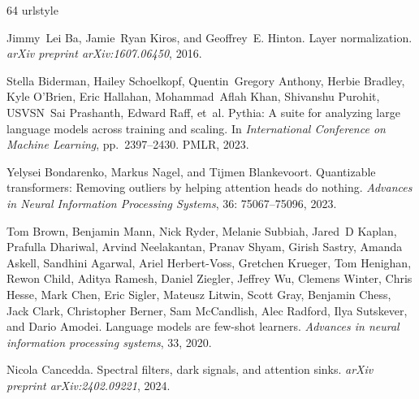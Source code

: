 \documentclass{article} \usepackage{iclr2025_conference,times}
\begin{document}
\begin{thebibliography}{64}
\providecommand{\natexlab}[1]{#1}
\providecommand{\url}[1]{\texttt{#1}}
\expandafter\ifx\csname urlstyle\endcsname\relax
  \providecommand{\doi}[1]{doi: #1}\else
  \providecommand{\doi}{doi: \begingroup \urlstyle{rm}\Url}\fi

Jimmy~Lei Ba, Jamie~Ryan Kiros, and Geoffrey~E. Hinton.
\newblock Layer normalization.
\newblock \emph{arXiv preprint arXiv:1607.06450}, 2016.

Stella Biderman, Hailey Schoelkopf, Quentin~Gregory Anthony, Herbie Bradley, Kyle O’Brien, Eric Hallahan, Mohammad~Aflah Khan, Shivanshu Purohit, USVSN~Sai Prashanth, Edward Raff, et~al.
\newblock Pythia: A suite for analyzing large language models across training and scaling.
\newblock In \emph{International Conference on Machine Learning}, pp.\  2397--2430. PMLR, 2023.

Yelysei Bondarenko, Markus Nagel, and Tijmen Blankevoort.
\newblock Quantizable transformers: Removing outliers by helping attention heads do nothing.
\newblock \emph{Advances in Neural Information Processing Systems}, 36: 75067--75096, 2023.

Tom Brown, Benjamin Mann, Nick Ryder, Melanie Subbiah, Jared~D Kaplan, Prafulla Dhariwal, Arvind Neelakantan, Pranav Shyam, Girish Sastry, Amanda Askell, Sandhini Agarwal, Ariel Herbert-Voss, Gretchen Krueger, Tom Henighan, Rewon Child, Aditya Ramesh, Daniel Ziegler, Jeffrey Wu, Clemens Winter, Chris Hesse, Mark Chen, Eric Sigler, Mateusz Litwin, Scott Gray, Benjamin Chess, Jack Clark, Christopher Berner, Sam McCandlish, Alec Radford, Ilya Sutskever, and Dario Amodei.
\newblock Language models are few-shot learners.
\newblock \emph{Advances in neural information processing systems}, 33, 2020.

Nicola Cancedda.
\newblock Spectral filters, dark signals, and attention sinks.
\newblock \emph{arXiv preprint arXiv:2402.09221}, 2024.


\end{thebibliography}
\end{document}
